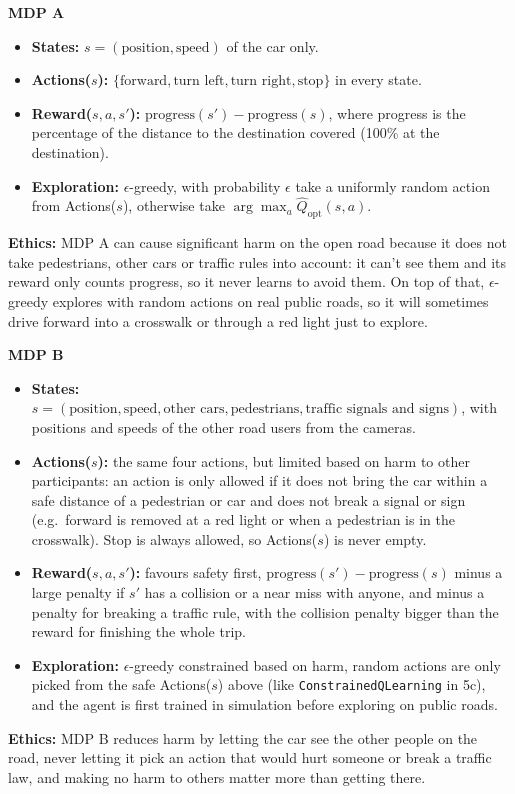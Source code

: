 \begin{answer}
  \textbf{MDP A}
  \begin{itemize}
    \item \textbf{States:} $s = (\text{position}, \text{speed})$ of the car only.
    \item \textbf{Actions($s$):} $\{\text{forward}, \text{turn left}, \text{turn right}, \text{stop}\}$ in every state.
    \item \textbf{Reward($s, a, s'$):} $\text{progress}(s') - \text{progress}(s)$, where progress is the percentage
      of the distance to the destination covered (100\% at the destination).
    \item \textbf{Exploration:} $\epsilon$-greedy, with probability $\epsilon$ take a uniformly random action from
      Actions($s$), otherwise take $\arg\max_a \hat{Q}_\text{opt}(s, a)$.
  \end{itemize}
  \textbf{Ethics:} MDP A can cause significant harm on the open road because it does not take pedestrians, other
  cars or traffic rules into account: it can't see them and its reward only counts progress, so it never learns to
  avoid them. On top of that, $\epsilon$-greedy explores with random actions on real public roads, so it will
  sometimes drive forward into a crosswalk or through a red light just to explore.

  \textbf{MDP B}
  \begin{itemize}
    \item \textbf{States:} $s = (\text{position}, \text{speed}, \text{other cars}, \text{pedestrians},
      \text{traffic signals and signs})$, with positions and speeds of the other road users from the cameras.
    \item \textbf{Actions($s$):} the same four actions, but limited based on harm to other participants: an action
      is only allowed if it does not bring the car within a safe distance of a pedestrian or car and does not
      break a signal or sign (e.g.\ forward is removed at a red light or when a pedestrian is in the crosswalk).
      Stop is always allowed, so Actions($s$) is never empty.
    \item \textbf{Reward($s, a, s'$):} favours safety first, $\text{progress}(s') - \text{progress}(s)$ minus a large
      penalty if $s'$ has a collision or a near miss with anyone, and minus a penalty for breaking a traffic rule,
      with the collision penalty bigger than the reward for finishing the whole trip.
    \item \textbf{Exploration:} $\epsilon$-greedy constrained based on harm, random actions are only picked from
      the safe Actions($s$) above (like \texttt{ConstrainedQLearning} in 5c), and the agent is first trained in
      simulation before exploring on public roads.
  \end{itemize}
  \textbf{Ethics:} MDP B reduces harm by letting the car see the other people on the road, never letting it pick
 an action that would hurt someone or break a traffic law, and making no harm to others matter
  more than getting there.
\end{answer}
\clearpage

